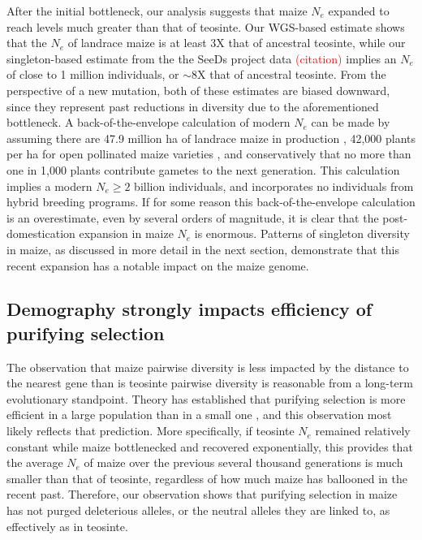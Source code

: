 \documentclass{pnastwo}
\begin{document}
\begin{article}
After the initial bottleneck, our analysis suggests that maize $N_e$ expanded to reach levels much greater than that of teosinte. Our WGS-based estimate shows that the $N_e$ of landrace maize is at least 3X that of ancestral teosinte, while our singleton-based estimate from the the SeeDs project data \textcolor{red}{(citation)} implies an $N_e$ of close to 1 million individuals, or $\sim$8X that of ancestral teosinte. From the perspective of a new mutation, both of these estimates are biased downward, since they represent past reductions in diversity due to the aforementioned bottleneck. A back-of-the-envelope calculation of modern $N_e$ can be made by assuming there are 47.9 million ha of landrace maize in production \cite{cimmyt1999}, 42,000 plants per ha for open pollinated maize varieties \cite{van2010}, and conservatively that no more than one in 1,000 plants contribute gametes to the next generation. This calculation implies a modern $N_e \geq  2$ billion individuals, and incorporates no individuals from hybrid breeding programs. If for some reason this back-of-the-envelope calculation is an overestimate, even by several orders of magnitude, it is clear that the post-domestication expansion in maize $N_e$ is enormous. Patterns of singleton diversity in maize, as discussed in more detail in the next section, demonstrate that this recent expansion has a notable impact on the maize genome.


\subsection{Demography strongly impacts efficiency of purifying selection}
The observation that maize pairwise diversity is less impacted by the distance to the nearest gene than is teosinte pairwise diversity is reasonable from a long-term evolutionary standpoint. Theory has established that purifying selection is more efficient in a large population than in a small one \cite{kimura1984}, and this observation most likely reflects that prediction. More specifically, if teosinte $N_e$ remained relatively constant while maize bottlenecked and recovered exponentially, this provides that the average $N_e$ of maize over the previous several thousand generations is much smaller than that of teosinte, regardless of how much maize has ballooned in the recent past. Therefore, our observation shows that purifying selection in maize has not purged deleterious alleles, or the neutral alleles they are linked to, as effectively as in teosinte.


\end{article}
\end{document}
